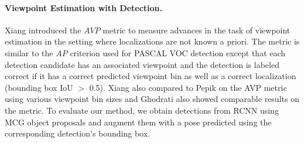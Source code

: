 \renewcommand{\arraystretch}{1.4}
\setlength{\tabcolsep}{6pt}
\begin{table}[htb!]
\centering
{}

\caption{Mean performance of our approach for various metrics. The detailed results for  individual classes can be found at the PASCAL3D leaderboard (\url{http://cvgl.stanford.edu/projects/pascal3d.html}).}
\label{table:poseDetEval}
\end{table}


\paragraph{Viewpoint Estimation with Detection.}
Xiang \etal \cite{pascal3d} introduced the $AVP$ metric to measure advances in the task of viewpoint estimation in the setting where localizations are not known a priori. The metric is similar to the $AP$ criterion used for PASCAL VOC detection except that each detection candidate has an associated viewpoint and the detection is labeled correct if it has a correct predicted viewpoint bin as well as a correct localization (bounding box IoU $>$ 0.5). Xiang \etal \cite{pascal3d} also compared to Pepik \etal \cite{pepik12dpm} on the AVP metric using various viewpoint bin sizes and Ghodrati \etal \cite{ghodrati14viewpoint} also showed comparable results on the metric. To evaluate our method, we obtain detections from RCNN \cite{rcnn} using MCG \cite{mcg2014} object proposals and augment them with a pose predicted using the corresponding detection's bounding box.

